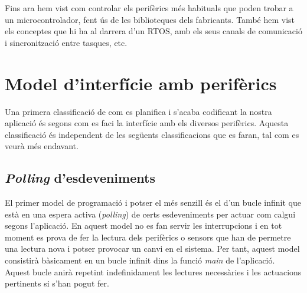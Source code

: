 



Fins ara hem vist com controlar els perifèrics més habituals que poden trobar a un microcontrolador, fent ús de les biblioteques dels fabricants. També hem vist els conceptes que hi ha al darrera d'un RTOS, amb els seus canals de comunicació i sincronització entre tasques, etc.

\chapter{Model d'interfície amb perifèrics}
\label{ch:modelinterficie}

Una primera classificació de com es planifica i s'acaba codificant la nostra aplicació és segons com es faci la interfície amb els diversos perifèrics. Aquesta classificació és independent de les següents classificacions que es faran, tal com es veurà més endavant.

\section{{\em Polling} d'esdeveniments}
\label{sec:polling}

El primer model de programació i potser el més senzill és el d'un bucle infinit que està en una espera activa ({\em polling}) de certs esdeveniments per actuar com calgui segons l'aplicació. En aquest model no es fan servir les interrupcions i en tot moment es prova de fer la lectura dels perifèrics o sensors que han de permetre una lectura nova i potser provocar un canvi en el sistema. Per tant, aquest model consistirà bàsicament en un bucle infinit dins la funció {\em main} de l'aplicació. Aquest bucle anirà repetint indefinidament les lectures necessàries i les actuacions pertinents si s'han pogut fer.

